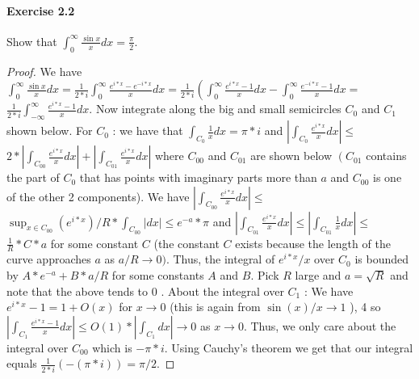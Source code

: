 \documentclass{article}
\begin{document}
\paragraph{Exercise 2.2} Show that $\int_{0}^{\infty} \frac{\sin x}{x} d x=\frac{\pi}{2}$.
\begin{proof}
    We have $\int_0^{\infty} \frac{\sin x}{x} d x=\frac{1}{2 * i} \int_0^{\infty} \frac{e^{i * x}-e^{-i * x}}{x} d x=\frac{1}{2 * i}\left(\int_0^{\infty} \frac{e^{i * x}-1}{x} d x-\int_0^{\infty} \frac{e^{-i * x}-1}{x} d x=\right.$ $\frac{1}{2 * i} \int_{-\infty}^{\infty} \frac{e^{i * x}-1}{x} d x$. Now integrate along the big and small semicircles $C_0$ and $C_1$ shown below. For $C_0$ : we have that $\int_{C_0} \frac{1}{x} d x=\pi * i$ and $\left|\int_{C_0} \frac{e^{i * x}}{x} d x\right| \leq$ $2 *\left|\int_{C_{00}} \frac{e^{i * x}}{x} d x\right|+\left|\int_{C_{01}} \frac{e^{i * x}}{x} d x\right|$ where $C_{00}$ and $C_{01}$ are shown below $\left(C_{01}\right.$ contains the part of $C_0$ that has points with imaginary parts more than $a$ and $C_{00}$ is one of the other 2 components). We have $\left|\int_{C_{00}} \frac{e^{i * x}}{x} d x\right| \leq$ $\sup _{x \in C_{00}}\left(e^{i * x}\right) / R * \int_{C_{00}}|d x| \leq e^{-a} * \pi$ and $\left|\int_{C_{01}} \frac{e^{i * x}}{x} d x\right| \leq\left|\int_{C_{01}} \frac{1}{x} d x\right| \leq$ $\frac{1}{R} * C * a$ for some constant $C$ (the constant $C$ exists because the length of the curve approaches $a$ as $a / R \rightarrow 0)$. Thus, the integral of $e^{i * x} / x$ over $C_0$ is bounded by $A * e^{-a}+B * a / R$ for some constants $A$ and $B$. Pick $R$ large and $a=\sqrt{R}$ and note that the above tends to 0 . About the integral over $C_1$ : We have $e^{i * x}-1=1+O(x)$ for $x \rightarrow 0$ (this is again from $\sin (x) / x \rightarrow 1$ ),
4
so $\left|\int_{C_1} \frac{e^{i * x}-1}{x} d x\right| \leq O(1) *\left|\int_{C_1} d x\right| \rightarrow 0$ as $x \rightarrow 0$. Thus, we only care about the integral over $C_{00}$ which is $-\pi * i$. Using Cauchy's theorem we get that our integral equals $\frac{1}{2 * i}(-(\pi * i))=\pi / 2$.
\end{proof}
\end{document}

